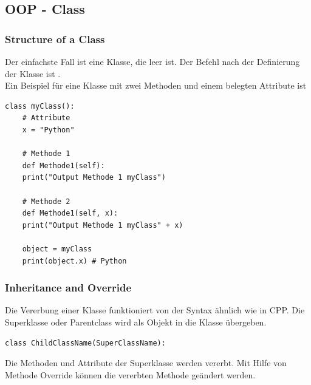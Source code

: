 \subsection{OOP - Class}
\subsubsection{Structure of a Class}
Der einfachste Fall ist eine Klasse, die leer ist. Der Befehl nach der Definierung der Klasse ist .\\

Ein Beispiel für eine Klasse mit zwei Methoden und einem belegten Attribute ist
\begin{lstlisting}[style=python]
	class myClass():
	# Attribute
	x = "Python"
	
	# Methode 1
	def Methode1(self):
	print("Output Methode 1 myClass")
	
	# Methode 2
	def Methode1(self, x):
	print("Output Methode 1 myClass" + x)
	
	object = myClass
	print(object.x) # Python
\end{lstlisting}
\subsubsection{Inheritance and Override}

Die Vererbung einer Klasse funktioniert von der Syntax ähnlich wie in \gls{CPP}. Die Superklasse oder Parentclass wird als Objekt in die Klasse übergeben.

\begin{lstlisting}[style=python]
	class ChildClassName(SuperClassName):
\end{lstlisting}
Die Methoden und Attribute der Superklasse werden vererbt. Mit Hilfe von Methode Override können die vererbten Methode geändert werden.\\

